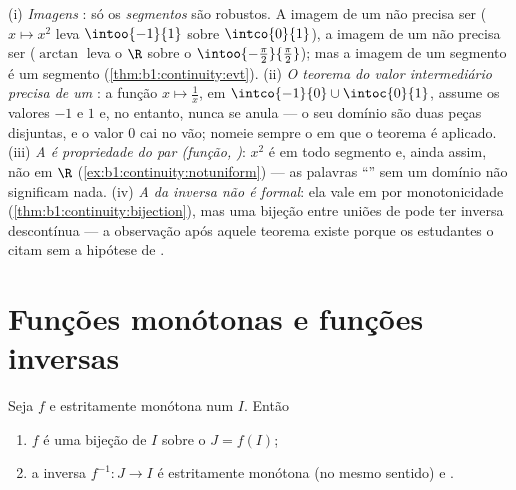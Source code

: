 \begin{remark}
(i) \emph{Imagens }: só os \emph{segmentos} são robustos.
A imagem  de um   não precisa ser 
($x \mapsto x^2$ leva $\intoo{-1}{1}$ sobre $\intco{0}{1}$), a
imagem de um  não precisa ser  ($\arctan$ leva o
 $\R$ sobre o 
$\intoo{-\frac\pi2}{\frac\pi2}$); mas a imagem de um segmento é
um segmento (\cref{thm:b1:continuity:evt}). (ii) \emph{O teorema do valor
intermediário precisa de um }: a função $x
\mapsto \frac1x$,  em $\intco{-1}{0} \cup
\intoc{0}{1}$, assume os valores $-1$ e $1$ e, no entanto, nunca se
anula --- o seu domínio são duas peças disjuntas, e o valor
$0$ cai no vão; nomeie sempre o  em que o
teorema é aplicado. (iii) \emph{A  é propriedade
do par (função, )}: $x^2$ é  em todo
segmento e, ainda assim, não em $\R$
(\cref{ex:b1:continuity:notuniform}) --- as palavras ``'' sem um domínio não significam nada. (iv)
\emph{A  da inversa não é formal}: ela vale em
 por monotonicidade
(\cref{thm:b1:continuity:bijection}), mas uma bijeção 
entre uniões de  pode ter inversa descontínua ---
a observação após aquele teorema existe porque os estudantes o citam
sem a hipótese de .
\end{remark}

\section{Funções monótonas e funções inversas}

\begin{theorem}\label{thm:b1:continuity:bijection}
Seja $f$  e estritamente monótona num  $I$. Então
\begin{enumerate}
  \item $f$ é uma bijeção de $I$ sobre o  $J = f(I)$;
  \item a inversa $f^{-1} \colon J \to I$ é estritamente monótona (no
        mesmo sentido) e \emph{}.
\end{enumerate}
\end{theorem}

